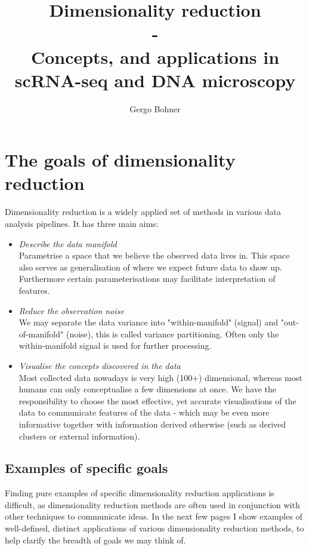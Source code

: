\documentclass[11pt]{article}
\title{Dimensionality reduction \\ - \\ Concepts, and applications in scRNA-seq and DNA microscopy}
\author{Gergo Bohner}
\begin{document}
\maketitle

\tableofcontents


\section{The goals of dimensionality reduction}

Dimensionality reduction is a widely applied set of methods in various data analysis pipelines. It has three main aims:

\begin{itemize}
	\item \emph{Describe the data manifold} \\ Parametrise a space that we believe the observed data lives in. This space also serves as generalisation of where we expect future data to show up. Furthermore certain parameterisations  may facilitate interpretation of features.
	\item \emph{Reduce the observation noise} \\ We may separate the data variance into "within-manifold" (signal) and "out-of-manifold" (noise), this is called variance partitioning. Often only the within-manifold signal is used for further processing.
	\item \emph{Visualise the concepts discovered in the data} \\ Most collected data nowadays is very high (100+) dimensional, whereas most humans can only conceptualise a few dimensions at once. We have the responsibility to choose the most effective, yet accurate visualisations of the data to communicate features of the data - which may be even more informative together with information derived otherwise (such as derived clusters or external information).
\end{itemize} 



\subsection{Examples of specific goals}

Finding pure examples of specific dimensionality reduction applications is difficult, as dimensionality reduction methods are often used in conjunction with other techniques to communicate ideas. In the next few pages I show examples of well-defined, distinct applications of various dimensionality reduction methods, to help clarify the breadth of goals we may think of.
 
\end{document}
